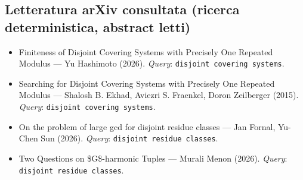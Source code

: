 \documentclass[11pt,a4paper]{article}
\begin{document}
\subsection{Letteratura arXiv consultata (ricerca deterministica, abstract letti)}
\begin{itemize}
\item \cite{2603.26043v1} Finiteness of Disjoint Covering Systems with Precisely One Repeated Modulus — Yu Hashimoto (2026). \emph{Query}: \texttt{disjoint covering systems}.
\item \cite{1511.04293v1} Searching for Disjoint Covering Systems with Precisely One Repeated Modulus — Shalosh B. Ekhad, Aviezri S. Fraenkel, Doron Zeilberger (2015). \emph{Query}: \texttt{disjoint covering systems}.
\item \cite{2607.24655v1} On the problem of large gcd for disjoint residue classes — Jan Fornal, Yu-Chen Sun (2026). \emph{Query}: \texttt{disjoint residue classes}.
\item \cite{2608.15873v1} Two Questions on \$G\$-harmonic Tuples — Murali Menon (2026). \emph{Query}: \texttt{disjoint residue classes}.
\end{itemize}
\end{document}
